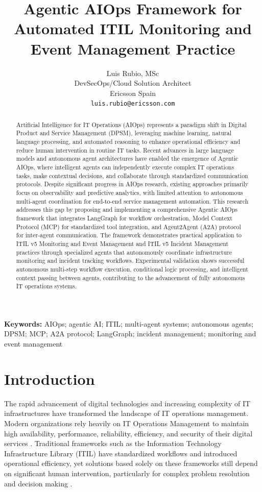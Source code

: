 \documentclass{article}
\title{Agentic AIOps Framework for Automated ITIL Monitoring and Event Management Practice}
\author{
  Luis Rubio, MSc \\
  DevSecOps/Cloud Solution Architect \\
  Ericsson Spain \\
  \texttt{luis.rubio@ericsson.com} \\
}
\begin{document}
\maketitle

\begin{abstract}
Artificial Intelligence for IT Operations (AIOps) represents a paradigm shift in Digital Product and Service Management (DPSM), leveraging machine learning, natural language processing, and automated reasoning to enhance operational efficiency and reduce human intervention in routine IT tasks. Recent advances in large language models and autonomous agent architectures have enabled the emergence of Agentic AIOps, where intelligent agents can independently execute complex IT operations tasks, make contextual decisions, and collaborate through standardized communication protocols. Despite significant progress in AIOps research, existing approaches primarily focus on observability and predictive analytics, with limited attention to autonomous multi-agent coordination for end-to-end service management automation. This research addresses this gap by proposing and implementing a comprehensive Agentic AIOps framework that integrates LangGraph for workflow orchestration, Model Context Protocol (MCP) for standardized tool integration, and Agent2Agent (A2A) protocol for inter-agent communication. The framework demonstrates practical application to ITIL v5 Monitoring and Event Management and ITIL v5 Incident Management practices through specialized agents that autonomously coordinate infrastructure monitoring and incident tracking workflows. Experimental validation shows successful autonomous multi-step workflow execution, conditional logic processing, and intelligent context passing between agents, contributing to the advancement of fully autonomous IT operations systems.
\end{abstract}

\noindent\textbf{Keywords:} AIOps; agentic AI; ITIL; multi-agent systems; autonomous agents; DPSM; MCP; A2A protocol; LangGraph; incident management; monitoring and event management

\section{Introduction}

The rapid advancement of digital technologies and increasing complexity of IT infrastructures have transformed the landscape of IT operations management. Modern organizations rely heavily on IT Operations Management to maintain high availability, performance, reliability, efficiency, and security of their digital services \cite{dang2019}. Traditional frameworks such as the Information Technology Infrastructure Library (ITIL) have standardized workflows and introduced operational efficiency, yet solutions based solely on these frameworks still depend on significant human intervention, particularly for complex problem resolution and decision making \cite{iden2013}.
\end{document}
